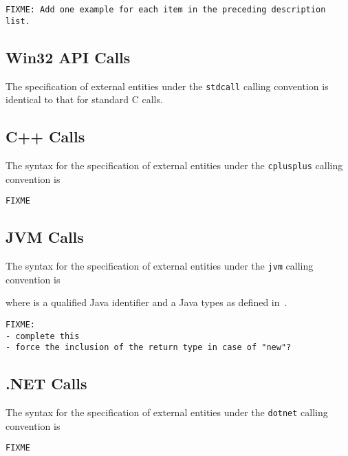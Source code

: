 \documentclass[a4paper,twosides]{article}
\newcommand{\code}[1]{\texttt{#1}}      %
\begin{document}
\begin{verbatim}
FIXME: Add one example for each item in the preceding description list.
\end{verbatim}

\subsection{Win32 API Calls}

The specification of external entities under the \code{stdcall} calling
convention is identical to that for standard C calls.


\begin{UNFINISHED} %

\subsection{C{+}{+} Calls}

The syntax for the specification of external entities under the
\code{cplusplus} calling convention is
%
\begin{verbatim}
FIXME
\end{verbatim}

\subsection{JVM Calls}

The syntax for the specification of external entities under the \code{jvm}
calling convention is 
%
\begin{grammar}
\end{grammar}
%
where  is a qualified Java identifier and  a Java
types as defined in~\cite{gosling-etal:Java}.

\begin{verbatim}
FIXME: 
- complete this
- force the inclusion of the return type in case of "new"?
\end{verbatim}

\subsection{.NET Calls}

The syntax for the specification of external entities under the \code{dotnet}
calling convention is
%
\begin{verbatim}
FIXME
\end{verbatim}

\end{UNFINISHED}%
\end{document}
